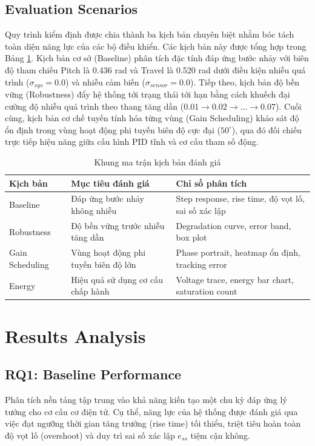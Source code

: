 \documentclass[conference, a4paper]{IEEEtran}
\begin{document}
\subsection{Evaluation Scenarios}
Quy trình kiểm định được chia thành ba kịch bản chuyên biệt nhằm bóc tách toàn diện năng lực của các bộ điều khiển. Các kịch bản này được tổng hợp trong Bảng \ref{tab:evaluation-scenario-matrix}. Kịch bản cơ sở (Baseline) phân tích đặc tính đáp ứng bước nhảy với biên độ tham chiếu Pitch là 0.436 rad và Travel là 0.520 rad dưới điều kiện nhiễu quá trình ($\sigma_{sys} = 0.0$) và nhiễu cảm biến ($\sigma_{sensor} = 0.0$). Tiếp theo, kịch bản độ bền vững (Robustness) đẩy hệ thống tới trạng thái tới hạn bằng cách khuếch đại cường độ nhiễu quá trình theo thang tăng dần ($0.01 \to 0.02 \to \dots \to 0.07$). Cuối cùng, kịch bản cơ chế tuyến tính hóa từng vùng (Gain Scheduling) khảo sát độ ổn định trong vùng hoạt động phi tuyến biên độ cực đại ($50^\circ$), qua đó đối chiếu trực tiếp hiệu năng giữa cấu hình PID tĩnh và cơ cấu tham số động.

\begin{table}[!t]
\caption{Khung ma trận kịch bản đánh giá}
\label{tab:evaluation-scenario-matrix}
\centering
\small
\begin{tabular}{>{\raggedright\arraybackslash}p{}>{\raggedright\arraybackslash}p{}>{\raggedright\arraybackslash}p{}}
\toprule
Kịch bản & Mục tiêu đánh giá & Chỉ số phân tích \\
\midrule
Baseline & Đáp ứng bước nhảy không nhiễu & Step response, rise time, độ vọt lố, sai số xác lập \\
Robustness & Độ bền vững trước nhiễu tăng dần & Degradation curve, error band, box plot \\
Gain Scheduling & Vùng hoạt động phi tuyến biên độ lớn & Phase portrait, heatmap ổn định, tracking error \\
Energy & Hiệu quả sử dụng cơ cấu chấp hành & Voltage trace, energy bar chart, saturation count \\
\bottomrule
\end{tabular}
\end{table}

\section{Results Analysis}

\subsection{RQ1: Baseline Performance}
Phân tích nền tảng tập trung vào khả năng kiến tạo một chu kỳ đáp ứng lý tưởng cho cơ cấu cơ điện tử. Cụ thể, năng lực của hệ thống được đánh giá qua việc đạt ngưỡng thời gian tăng trưởng (rise time) tối thiểu, triệt tiêu hoàn toàn độ vọt lố (overshoot) và duy trì sai số xác lập $e_{ss}$ tiệm cận không. 
\end{document}
